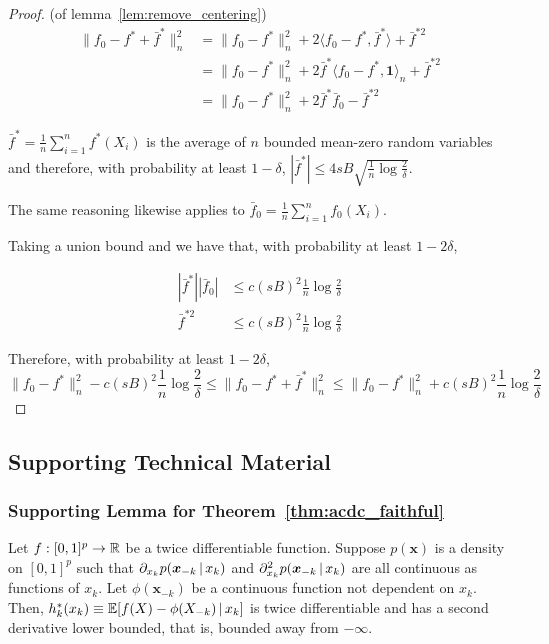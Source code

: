 \begin{proof} (of lemma~\ref{lem:remove_centering})
\begin{align*}
\| f_0 - f^* + \bar{f}^* \|_n^2 &= \| f_0 - f^* \|_n^2 
    + 2 \langle f_0 - f^*, \bar{f}^* \rangle + \bar{f}^{*2} \\
  &= \| f_0 - f^* \|_n^2 + 2 \bar{f}^* \langle f_0 - f^*, \mathbf{1} \rangle_n + 
    \bar{f}^{*2} \\
  &= \| f_0 - f^* \|_n^2 + 2 \bar{f}^* \bar{f}_0 - \bar{f}^{*2}
\end{align*}


$\bar{f}^* = \frac{1}{n} \sum_{i=1}^n f^*(X_i)$ is the average of $n$ bounded mean-zero random variables and therefore, with probability at least $1-\delta$, $| \bar{f}^* | \leq 4 sB \sqrt{ \frac{1}{n} \log \frac{2}{\delta} }$.

The same reasoning likewise applies to $\bar{f}_0 = \frac{1}{n} \sum_{i=1}^n f_0(X_i)$.

Taking a union bound and we have that, with probability at least $1- 2\delta$, 

\begin{align*}
| \bar{f}^* | | \bar{f}_0 | &\leq c (sB)^2 \frac{1}{n} \log \frac{2}{\delta} \\
\bar{f}^{*2} &\leq c (sB)^2 \frac{1}{n} \log \frac{2}{\delta}
\end{align*}

Therefore, with probability at least $1 - 2\delta$,
\[
\|f_0 - f^*\|_n^2 - c (sB)^2 \frac{1}{n} \log \frac{2}{\delta} \leq
    \| f_0 - f^* + \bar{f}^* \|_n^2 \leq 
\|f_0 - f^*\|_n^2 + c (sB)^2 \frac{1}{n} \log \frac{2}{\delta}
\]

\end{proof}





 \subsection{Supporting Technical Material}
 
\subsubsection{Supporting Lemma for Theorem~\ref{thm:acdc_faithful}}

\begin{lemma}
\label{lem:acdc_derivative_bound}
Let $f : [0,1]^p \rightarrow {\mathbb R}$ be a twice differentiable function. Suppose $p(\mathbf{x})$ is a density on $[0,1]^p$ such that $\partial_{x_k} p(\mbox{\boldmath $x$}_{-k} {\,|\,} x_k)$ and $\partial_{x_k}^2 p(\mbox{\boldmath $x$}_{-k} {\,|\,} x_k)$ are all continuous as functions of $x_k$. Let $\phi(\mathbf{x}_{-k})$ be a continuous function not dependent on $x_k$.\\

Then, $h^*_k(x_k) \equiv {\mathbb E}[ f(X) - \phi(X_{-k}) {\,|\,} x_k]$ is twice differentiable and has a second derivative lower bounded, that is, bounded away from $-\infty$.
\end{lemma}

